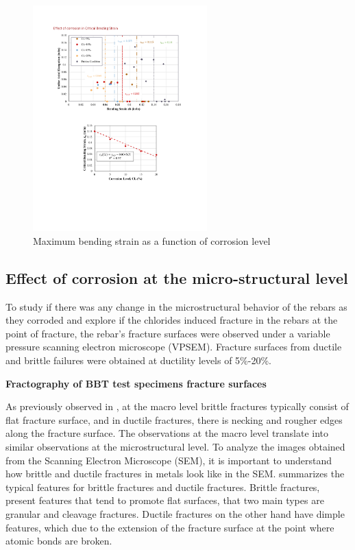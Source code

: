 \begin{figure}[htbp]
	\centering
	\includegraphics[width=0.6\textwidth]{VAC Thesis 2.0/Chapter-4/figs/BBT_results_summary.pdf}
	\caption{Maximum bending strain as a function of corrosion level}
	\label{fig:eb_vs_CL}
\end{figure}

\subsection{Effect of corrosion at the micro-structural level}

To study if there was any change in the microstructural behavior of the rebars as they corroded and explore if the chlorides induced fracture in the rebars at the point of fracture, the rebar's fracture surfaces were observed under a variable pressure scanning electron microscope (VPSEM). Fracture surfaces from ductile and brittle failures were obtained at ductility levels of 5\%-20\%.

\textbf{Fractography of BBT test specimens fracture surfaces}

 As previously observed in , at the macro level brittle fractures typically consist of flat fracture surface, and in ductile fractures, there is necking and rougher edges along the fracture surface. The observations at the macro level translate into similar observations at the microstructural level. To analyze the images obtained from the Scanning Electron Microscope (SEM), it is important to understand how brittle and ductile fractures in metals look like in the SEM.  summarizes the typical features for brittle fractures and ductile fractures. Brittle fractures, present features that tend to promote flat surfaces, that two main types are granular and cleavage fractures. Ductile fractures on the other hand have dimple features, which due to the extension of the fracture surface at the point where atomic bonds are broken.
 
